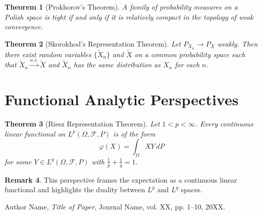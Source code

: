 \documentclass[11pt]{amsart}
\newtheorem{theorem}{Theorem}[section]
\theoremstyle{definition}
\newtheorem{remark}[theorem]{Remark}
\theoremstyle{remark}
\begin{document}
\begin{theorem}[Prokhorov's Theorem]
A family of probability measures on a Polish space is tight if and only if it is relatively compact in the topology of weak convergence.
\end{theorem}

\begin{theorem}[Skorokhod's Representation Theorem]
Let $P_{X_n} \to P_X$ weakly. Then there exist random variables $\{\tilde{X}_n\}$ and $\tilde{X}$ on a common probability space such that $\tilde{X}_n \xrightarrow{a.s.} \tilde{X}$ and $\tilde{X}_n$ has the same distribution as $X_n$ for each $n$.
\end{theorem}

\section{Functional Analytic Perspectives}

\begin{theorem}[Riesz Representation Theorem]
Let $1 < p < \infty$. Every continuous linear functional on $L^p(\Omega, \mathcal{F}, P)$ is of the form
\[
\varphi(X) = \int_\Omega X Y \, dP
\]
for some $Y \in L^q(\Omega, \mathcal{F}, P)$ with $\frac{1}{p} + \frac{1}{q}=1$.
\end{theorem}

\begin{remark}
This perspective frames the expectation as a continuous linear functional and highlights the duality between $L^p$ and $L^q$ spaces.
\end{remark}


\begin{thebibliography}{9}

Author Name, \emph{Title of Paper}, Journal Name, vol. XX, pp. 1--10, 20XX.

\end{thebibliography}
\end{document}
